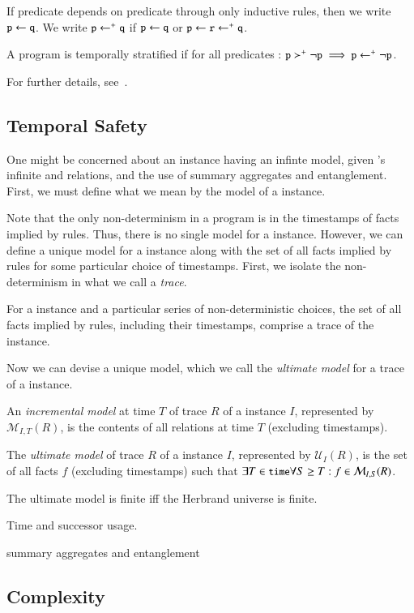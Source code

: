 If predicate  depends on predicate  through only
inductive rules, then we write $\dedalus{p} \gets \dedalus{q}$.  We write
$\dedalus{p} \gets^+ \dedalus{q}$ if $\dedalus{p} \gets \dedalus{q}$ or
$\dedalus{p} \gets \dedalus{r} \gets^+ \dedalus{q}$.

\begin{definition}
%
A \lang program is temporally stratified if for all predicates :
$\dedalus{p} \succ^+ \lnot \dedalus{p} \implies \dedalus{p} \gets^+ \lnot
\dedalus{p}$.
%
\end{definition}

For further details, see~\cite{dedalus-techr}.

\subsection{Temporal Safety}

One might be concerned about an instance having an infinte model, given \lang's
infinite  and  relations, and the use of
summary aggregates and entanglement.  First, we must define what we mean by the
model of a \lang instance.

Note that the only non-determinism in a \lang program is in the timestamps of
facts implied by  rules.  Thus, there is no single model for a
\lang instance.  However, we can define a unique model for a \lang instance
along with the set of all facts implied by  rules for some
particular choice of timestamps.  First, we isolate the non-determinism in what
we call a {\em trace}.

\begin{definition}
%
For a \lang instance and a particular series of non-deterministic choices, the
set of all facts implied by  rules, including their timestamps,
comprise a trace of the instance.
%
\end{definition}

Now we can devise a unique model, which we call the {\em ultimate model} for a
trace of a \lang instance.

\begin{definition}
%
An {\em incremental model} at time $T$ of trace $R$ of a \lang instance $I$,
represented by $\mathcal{M}_{I,T}(R)$, is the contents of all
relations at time $T$ (excluding timestamps).
%
\end{definition}

\begin{definition}
%
The {\em ultimate model} of trace $R$ of a \lang instance $I$, represented by
$\mathcal{U}_{I}(R)$, is the set of all facts $f$ (excluding timestamps) such
that $\exists T \in \dedalus{time} \forall S \geq T: f \in
\mathcal{M}_{I,S}(R)$.
%
\end{definition}

The ultimate model is finite iff the Herbrand universe is finite.

Time and successor usage.

summary aggregates and entanglement

\subsection{Complexity}

